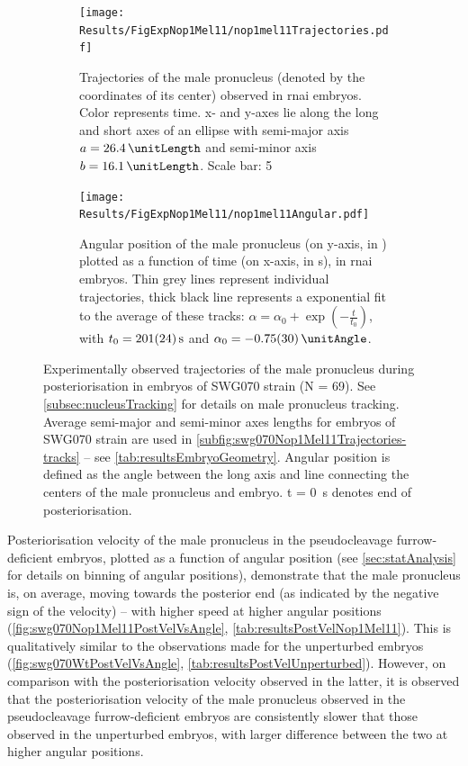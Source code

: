 \begin{figure}
\centering
\begin{subfigure}[t]{0.4\textwidth}
    \centering
    \texttt{[image: Results/FigExpNop1Mel11/nop1mel11Trajectories.pdf]}
    \caption{Trajectories of the male pronucleus (denoted by the coordinates of its center) observed in  \ac{rnai} embryos. Color represents time. x- and y-axes lie along the long and short axes of an ellipse with semi-major axis $a = \SI{26.4}{\unitLength}$ and semi-minor axis $b = \SI{16.1}{\unitLength}$. Scale bar: \SI{5}{\unitLength}}
    \label{subfig:swg070Nop1Mel11Trajectories-tracks}
\end{subfigure}
\hfill
\begin{subfigure}[t]{0.57\textwidth}
    \centering
    \texttt{[image: Results/FigExpNop1Mel11/nop1mel11Angular.pdf]}
    \caption{Angular position of the male pronucleus (on y-axis, in \si{\unitAngle}) plotted as a function of time (on x-axis, in \si{\second}), in  \ac{rnai} embryos. Thin grey lines represent individual trajectories, thick black line represents a exponential fit to the average of these tracks: $\alpha = \alpha_0 + \exp(-\frac{t}{t_0})$, with $t_0 = \SI{201 +- 24}{\second}$ and $\alpha_0 = \SI{-0.75 +- 0.3}{\unitAngle}$.} 
    \label{subfig:swg070Nop1Mel11Trajectories-angleVsTime}
\end{subfigure}
\caption[Experimentally observed trajectories of the male pronucleus in  embryos]{Experimentally observed trajectories of the male pronucleus during posteriorisation in  embryos of SWG070 strain (N = 69). See \autoref{subsec:nucleusTracking} for details on male pronucleus tracking. Average semi-major and semi-minor axes lengths for  embryos of SWG070 strain are used in \autoref{subfig:swg070Nop1Mel11Trajectories-tracks} -- see \autoref{tab:resultsEmbryoGeometry}. Angular position is defined as the angle between the long axis and line connecting the centers of the male pronucleus and embryo. t = \SI{0}{\second} denotes end of posteriorisation.}
\label{fig:swg070Nop1Mel11Trajectories}
\end{figure}

Posteriorisation velocity of the male pronucleus in the pseudocleavage furrow-deficient embryos, plotted as a function of angular position (see \autoref{sec:statAnalysis} for details on binning of angular positions), demonstrate that the male pronucleus is, on average, moving towards the posterior end (as indicated by the negative sign of the velocity) -- with higher speed at higher angular positions (\autoref{fig:swg070Nop1Mel11PostVelVsAngle}, \autoref{tab:resultsPostVelNop1Mel11}). This is qualitatively similar to the observations made for the unperturbed embryos (\autoref{fig:swg070WtPostVelVsAngle}, \autoref{tab:resultsPostVelUnperturbed}). However, on comparison with the posteriorisation velocity observed in the latter, it is observed that the posteriorisation velocity of the male pronucleus observed in the pseudocleavage furrow-deficient embryos are consistently slower that those observed in the unperturbed embryos, with larger difference between the two at higher angular positions. 

